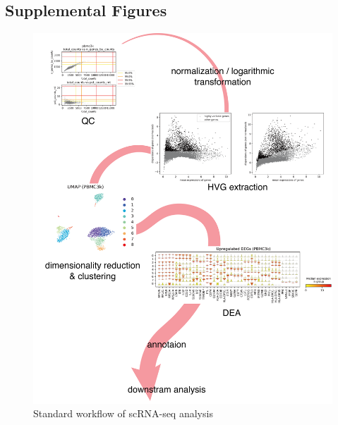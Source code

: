 \documentclass{article}
\begin{document}
\newpage
\subsection*{Supplemental Figures}
\begin{figure}[htb]
  \centering
  \includegraphics[scale=0.6]{./figs/exported/figure_s1.png}
  \caption{Standard workflow of scRNA-seq analysis}
  \label{fig_s1}
\end{figure}
\end{document}

